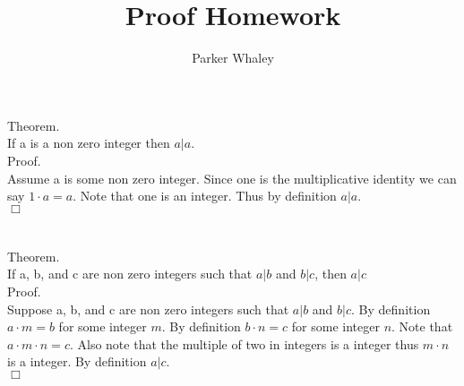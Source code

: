 \documentclass[10pt,a4paper]{article}
\author{Parker Whaley}
\title{Proof Homework}
\begin{document}
\maketitle
\section{}
Theorem.\\
If a is a non zero integer then $a|a$.\\
Proof.\\
Assume a is some non zero integer.  Since one is the multiplicative identity we can say $1\cdot a=a$.  Note that one is an integer.  Thus by definition $a|a$.\\
$\Box$
\section{}
Theorem.\\
If a, b, and c are non zero integers such that $a|b$ and $b|c$, then $a|c$\\
Proof.\\
Suppose a, b, and c are non zero integers such that $a|b$ and $b|c$.  By definition $a\cdot m=b$ for some integer $m$.  By definition $b\cdot n=c$ for some integer $n$.  Note that $a\cdot m \cdot n=c$.  Also note that the multiple of two in integers is a integer thus $m\cdot n$ is a integer.  By definition $a|c$.\\
$\Box$
\end{document}
